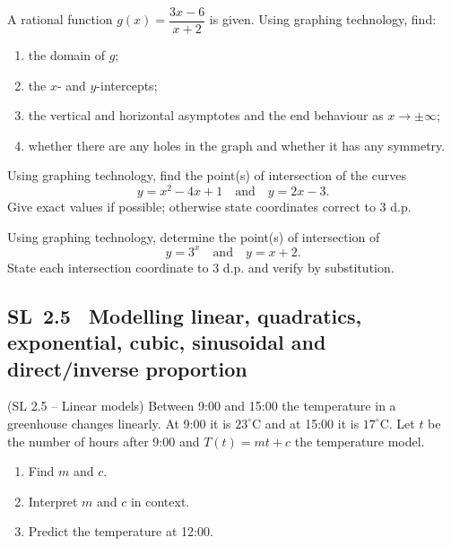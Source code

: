 \documentclass[11pt]{article}
\def\textit#1{#1}%
\newcommand{\tocsubsection}[1]{\subsection{#1}}
\newcounter{question}
\begin{document}
\begin{question}
A rational function $g(x)=\dfrac{3x-6}{x+2}$ is given. Using graphing technology, find:
\begin{enumerate}
  \item the domain of $g$;
  \item the $x$- and $y$-intercepts;
  \item the vertical and horizontal asymptotes and the end behaviour as $x\to\pm\infty$;
  \item whether there are any holes in the graph and whether it has any symmetry.
\end{enumerate}
\end{question}

\begin{question}
Using graphing technology, find the point(s) of intersection of the curves
\[
y=x^{2}-4x+1 \quad\text{and}\quad y=2x-3.
\]
Give exact values if possible; otherwise state coordinates correct to 3 d.p.
\end{question}

\begin{question}
Using graphing technology, determine the point(s) of intersection of
\[
y=3^{x} \quad\text{and}\quad y=x+2.
\]
State each intersection coordinate to 3 d.p. and verify by substitution.
\end{question}









\tocsubsection{SL 2.5 \;  Modelling linear, quadratics, exponential, cubic, sinusoidal and direct/inverse proportion}


\begin{question}
\textit{(SL 2.5 – Linear models)}
Between 9:00 and 15:00 the temperature in a greenhouse changes linearly. At 9:00 it is $23^\circ$C and at 15:00 it is $17^\circ$C. Let $t$ be the number of hours after 9:00 and $T(t)=mt+c$ the temperature model.
\begin{enumerate}
  \item Find $m$ and $c$.
  \item Interpret $m$ and $c$ in context.
  \item Predict the temperature at 12:00.
\end{enumerate}
\end{question}
\end{document}
